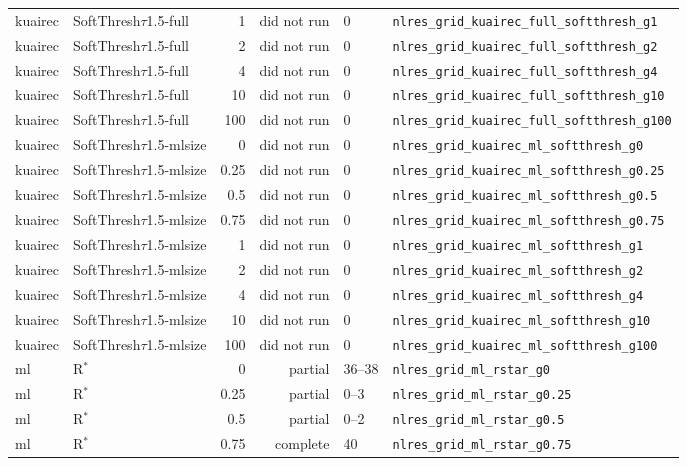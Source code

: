 \documentclass[10pt,a4paper]{article}
\begin{document}
{\begin{longtable}{llrrll}
kuairec & SoftThresh$\tau$1.5-full & 1 & did not run & 0 & \texttt{nlres\_grid\_kuairec\_full\_softthresh\_g1} \\
kuairec & SoftThresh$\tau$1.5-full & 2 & did not run & 0 & \texttt{nlres\_grid\_kuairec\_full\_softthresh\_g2} \\
kuairec & SoftThresh$\tau$1.5-full & 4 & did not run & 0 & \texttt{nlres\_grid\_kuairec\_full\_softthresh\_g4} \\
kuairec & SoftThresh$\tau$1.5-full & 10 & did not run & 0 & \texttt{nlres\_grid\_kuairec\_full\_softthresh\_g10} \\
kuairec & SoftThresh$\tau$1.5-full & 100 & did not run & 0 & \texttt{nlres\_grid\_kuairec\_full\_softthresh\_g100} \\
kuairec & SoftThresh$\tau$1.5-mlsize & 0 & did not run & 0 & \texttt{nlres\_grid\_kuairec\_ml\_softthresh\_g0} \\
kuairec & SoftThresh$\tau$1.5-mlsize & 0.25 & did not run & 0 & \texttt{nlres\_grid\_kuairec\_ml\_softthresh\_g0.25} \\
kuairec & SoftThresh$\tau$1.5-mlsize & 0.5 & did not run & 0 & \texttt{nlres\_grid\_kuairec\_ml\_softthresh\_g0.5} \\
kuairec & SoftThresh$\tau$1.5-mlsize & 0.75 & did not run & 0 & \texttt{nlres\_grid\_kuairec\_ml\_softthresh\_g0.75} \\
kuairec & SoftThresh$\tau$1.5-mlsize & 1 & did not run & 0 & \texttt{nlres\_grid\_kuairec\_ml\_softthresh\_g1} \\
kuairec & SoftThresh$\tau$1.5-mlsize & 2 & did not run & 0 & \texttt{nlres\_grid\_kuairec\_ml\_softthresh\_g2} \\
kuairec & SoftThresh$\tau$1.5-mlsize & 4 & did not run & 0 & \texttt{nlres\_grid\_kuairec\_ml\_softthresh\_g4} \\
kuairec & SoftThresh$\tau$1.5-mlsize & 10 & did not run & 0 & \texttt{nlres\_grid\_kuairec\_ml\_softthresh\_g10} \\
kuairec & SoftThresh$\tau$1.5-mlsize & 100 & did not run & 0 & \texttt{nlres\_grid\_kuairec\_ml\_softthresh\_g100} \\
ml & R$^*$ & 0 & partial & 36--38 & \texttt{nlres\_grid\_ml\_rstar\_g0} \\
ml & R$^*$ & 0.25 & partial & 0--3 & \texttt{nlres\_grid\_ml\_rstar\_g0.25} \\
ml & R$^*$ & 0.5 & partial & 0--2 & \texttt{nlres\_grid\_ml\_rstar\_g0.5} \\
ml & R$^*$ & 0.75 & complete & 40 & \texttt{nlres\_grid\_ml\_rstar\_g0.75} \\

\end{longtable}}
\end{document}
